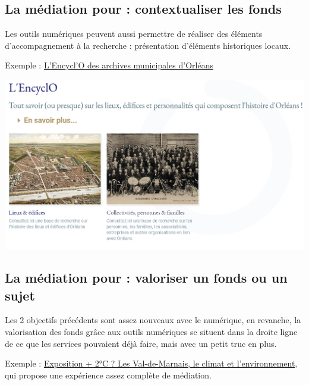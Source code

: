 \documentclass[
  letterpaper,
  DIV=11,
  numbers=noendperiod]{scrartcl}
\begin{document}
\subsection{La médiation pour : contextualiser les
fonds}\label{la-muxe9diation-pour-contextualiser-les-fonds}

Les outils numériques peuvent aussi permettre de réaliser des éléments
d'accompagnement à la recherche : présentation d'éléments historiques
locaux.

Exemple :
\href{https://archives.orleans-metropole.fr/histoires-dorleans/lencyclo}{L'Encycl'O
des archives municipales d'Orléans}

\begin{center}
\includegraphics{img/encyclo.png}
\end{center}

\subsection{La médiation pour : valoriser un fonds ou un
sujet}\label{la-muxe9diation-pour-valoriser-un-fonds-ou-un-sujet}

Les 2 objectifs précédents sont assez nouveaux avec le numérique, en
revanche, la valorisation des fonds grâce aux outils numériques se
situent dans la droite ligne de ce que les services pouvaient déjà
faire, mais avec un petit truc en plus.

Exemple :
\href{https://archives.valdemarne.fr/patrimoine-et-histoire/autour-de-nos-expositions/les-val-de-marnais-le-climat-et-lenvironnement}{Exposition
+ 2°C ? Les Val-de-Marnais, le climat et l'environnement}, qui propose
une expérience assez complète de médiation.
\end{document}
